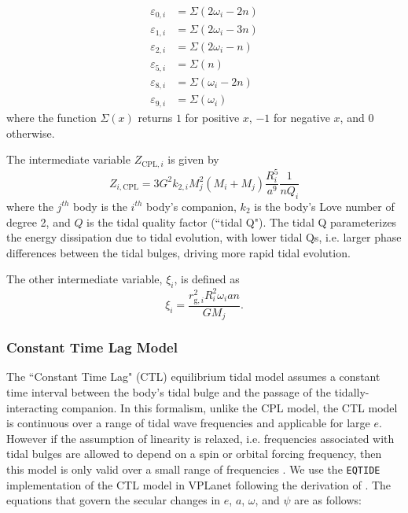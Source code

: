 \documentclass[twocolumn]{aastex61}
\newcommand{\eqtide}[0]{\texttt{EQTIDE}\xspace}
\begin{document}
\begin{equation} \label{eqn:cpl:eps}
\begin{split}
\varepsilon_{0,i} & = \Sigma(2 \omega_i - 2n) \\
\varepsilon_{1,i} & = \Sigma(2 \omega_i - 3n) \\
\varepsilon_{2,i} & = \Sigma(2 \omega_i - n) \\
\varepsilon_{5,i} & = \Sigma(n) \\
\varepsilon_{8,i} & = \Sigma(\omega_i - 2n) \\
\varepsilon_{9,i} & = \Sigma(\omega_i)
\end{split}
\end{equation}
where the function $\Sigma(x)$ returns $1$ for positive $x$, $-1$ for negative $x$, and $0$ otherwise.

The intermediate variable $Z_{\mathrm{CPL},i}$ is given by
\begin{equation} \label{eqn:cpl:z}
Z_{i,\mathrm{CPL}} = 3 G^2 k_{2,i} M_j^2 (M_i + M_j) \frac{R_i^5}{a^9} \frac{1}{n Q_i}
\end{equation}
where the $j^{th}$ body is the $i^{th}$ body's companion, $k_{2}$ is the body's Love number of degree 2, and $Q$ is the tidal quality factor (``tidal Q"). The tidal Q parameterizes the energy dissipation due to tidal evolution, with lower tidal Qs, i.e. larger phase differences between the tidal bulges, driving more rapid tidal evolution.

The other intermediate variable, $\xi_i$, is defined as
\begin{equation}\label{eqn:cpl:chi}
\xi_i = \frac{r_{\mathrm{g},i}^2 R_i^2 \omega_i a n }{ G M_j}.
\end{equation}

\subsubsection{Constant Time Lag Model}

The ``Constant Time Lag" (CTL) \citep[][]{Hut1981,Leconte2010} equilibrium tidal model assumes a constant time interval between the body's tidal bulge and the passage of the tidally-interacting companion. In this formalism, unlike the CPL model, the CTL model is continuous over a range of tidal wave frequencies and applicable for large $e$.  However if the assumption of linearity is relaxed, i.e. frequencies associated with tidal bulges are allowed to depend on a spin or orbital forcing frequency, then this model is only valid over a small range of frequencies \citep{Greenberg2009}. We use the \eqtide implementation of the CTL model in VPLanet following the derivation of \citet{Leconte2010}.  The equations that govern the secular changes in $e$, $a$, $\omega$, and $\psi$ are as follows:
\end{document}
